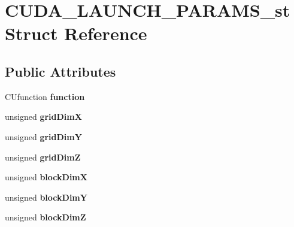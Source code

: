 \hypertarget{structCUDA__LAUNCH__PARAMS__st}{}\section{C\+U\+D\+A\+\_\+\+L\+A\+U\+N\+C\+H\+\_\+\+P\+A\+R\+A\+M\+S\+\_\+st Struct Reference}
\label{structCUDA__LAUNCH__PARAMS__st}
\subsection*{Public Attributes}
\begin{DoxyCompactItemize}
\item 
C\+Ufunction {\bfseries function}\hypertarget{structCUDA__LAUNCH__PARAMS__st_a7bfdf4c843f3d977eb78d2d49feb6e36}{}\label{structCUDA__LAUNCH__PARAMS__st_a7bfdf4c843f3d977eb78d2d49feb6e36}

\item 
unsigned {\bfseries grid\+DimX}\hypertarget{structCUDA__LAUNCH__PARAMS__st_af2aec4cc6b0494cf6e89b87fcfd5d6d0}{}\label{structCUDA__LAUNCH__PARAMS__st_af2aec4cc6b0494cf6e89b87fcfd5d6d0}

\item 
unsigned {\bfseries grid\+DimY}\hypertarget{structCUDA__LAUNCH__PARAMS__st_af53e7f626f965242409703f3f6982cc4}{}\label{structCUDA__LAUNCH__PARAMS__st_af53e7f626f965242409703f3f6982cc4}

\item 
unsigned {\bfseries grid\+DimZ}\hypertarget{structCUDA__LAUNCH__PARAMS__st_ac350ef2a791d9959f282e07a6ed37872}{}\label{structCUDA__LAUNCH__PARAMS__st_ac350ef2a791d9959f282e07a6ed37872}

\item 
unsigned {\bfseries block\+DimX}\hypertarget{structCUDA__LAUNCH__PARAMS__st_a96fc33aa2085eed45be54d88c74bd940}{}\label{structCUDA__LAUNCH__PARAMS__st_a96fc33aa2085eed45be54d88c74bd940}

\item 
unsigned {\bfseries block\+DimY}\hypertarget{structCUDA__LAUNCH__PARAMS__st_a6163f5f86a9b25dccd65da640e804081}{}\label{structCUDA__LAUNCH__PARAMS__st_a6163f5f86a9b25dccd65da640e804081}

\item 
unsigned {\bfseries block\+DimZ}\hypertarget{structCUDA__LAUNCH__PARAMS__st_a24d0a98f909f28ae9b60a03052fa6c21}{}\label{structCUDA__LAUNCH__PARAMS__st_a24d0a98f909f28ae9b60a03052fa6c21}


\end{DoxyCompactItemize}
